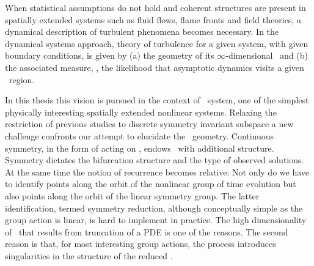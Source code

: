 
When statistical assumptions do not hold and coherent
structures are present in spatially extended systems
such as fluid flows, flame fronts and field theories,
a dynamical description of turbulent phenomena becomes
necessary.
In the dynamical systems approach, theory of turbulence for a
given system, with given boundary conditions, is given by (a)
the geometry of its $\infty$-dimensional \statesp\ and (b) the associated measure,
\ie, the likelihood that asymptotic dynamics visits a given
\statesp\ region.

In this thesis this vision is pursued in the context of \KS\
system, one of the simplest physically interesting spatially
extended nonlinear systems. Relaxing the restriction of
previous studies to discrete
symmetry invariant subspace a new challenge confronts our
attempt to elucidate the \statesp\ geometry. Continuous
symmetry, in the form of  acting on
\statesp, endows \statesp\ with additional structure.
Symmetry dictates the bifurcation structure and the type of
observed solutions. At the same time the notion of recurrence becomes
relative: Not only do we have to identify points along the
orbit of the nonlinear group of time evolution but also points
along the orbit of the linear symmetry group. The latter
identification, termed symmetry reduction, although
conceptually simple as the group action is linear, is hard to
implement in practice. The high dimensionality of \statesp\
that results from truncation of a PDE is one of the reasons.
The second reason is that, for most interesting group actions,
the process introduces singularities in the structure of the
reduced \statesp.


